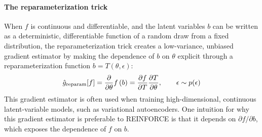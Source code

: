 \documentclass{article}
\newcommand{\PT}{\frac{\partial}{\partial \theta}}
\begin{document}
\paragraph{The reparameterization trick}
When $f$ is continuous and differentiable, and the latent variables $b$ can be written as a deterministic, differentiable function of a random draw from a fixed distribution, the reparameterization trick \citep{williams1992simple, kingma2013autoencoding, rezende2014stochastic} creates a low-variance, unbiased gradient estimator by making the dependence of $b$ on $\theta$ explicit through a reparameterization function $b=T(\theta, \epsilon)$:
%
\begin{align}
\hat g_\textnormal{reparam}[f]
= \PT f \left( b \right)
= \frac{\partial f}{\partial T}\frac{\partial T}{\partial \theta} , 
\qquad \epsilon \sim p(\epsilon) 
\end{align}
%
This gradient estimator is often used when training high-dimensional, continuous latent-variable models, such as variational autoencoders.
One intuition for why this gradient estimator is preferable to REINFORCE is that it depends on ${\partial f} / {\partial b}$, which exposes the dependence of $f$ on $b$.

\end{document}
